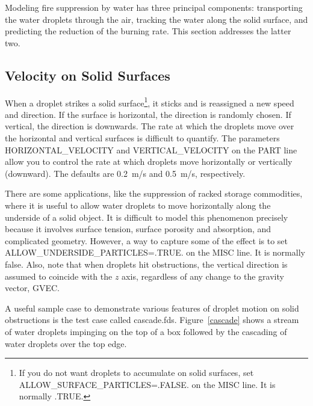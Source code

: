 \documentclass[11pt]{book}
\begin{document}
Modeling fire suppression by water has three principal components: transporting the water droplets through the air, tracking the water along the solid surface, and predicting the reduction of the burning rate. This section addresses the latter two.


\subsection{Velocity on Solid Surfaces}
\label{info:surface_droplets}

When a droplet strikes a solid surface\footnote{If you do not want droplets to accumulate on solid surfaces, set {\ct ALLOW\_SURFACE\_PARTICLES=.FALSE.} on the
{\ct MISC} line. It is normally {\ct .TRUE.}}, it sticks and is reassigned a new speed and direction. If the surface is
horizontal, the direction is randomly chosen. If vertical, the direction is downwards.
The rate at which the droplets move over the horizontal and vertical surfaces is difficult to
quantify. The parameters {\ct HORIZONTAL\_VELOCITY} and {\ct VERTICAL\_VELOCITY} on the {\ct PART} line
allow you to control the rate at which droplets move horizontally or vertically (downward). The defaults are
0.2~m/s and 0.5~m/s, respectively.

There are some applications, like the suppression of racked storage commodities, where it is useful to allow water droplets to move horizontally
along the underside of a solid object. It is difficult to model this phenomenon precisely because it involves surface tension, surface porosity and
absorption, and complicated geometry. However, a way to capture some of the effect is to set {\ct ALLOW\_UNDERSIDE\_PARTICLES=.TRUE.} on the
{\ct MISC} line. It is normally false. Also, note that when droplets hit obstructions, the vertical direction is assumed to coincide with the $z$ axis, regardless of any change to the gravity vector, {\ct GVEC}.

A useful sample case to demonstrate various features of droplet motion on solid obstructions is the test case called {\ct cascade.fds}. Figure~\ref{cascade} shows a stream
of water droplets impinging on the top of a box followed by the cascading of water droplets over the top edge.
\end{document}
